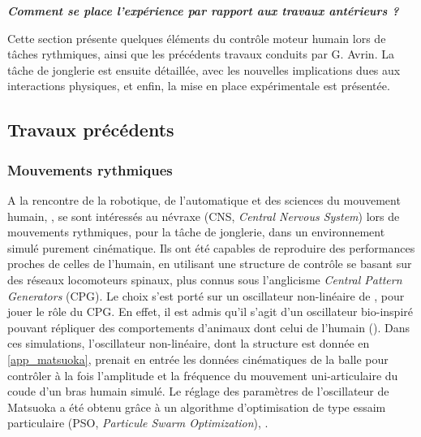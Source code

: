 \documentclass[12pt, a4paper]{article} %
\numberwithin{equation}{section}
\begin{document}
\begin{flushright}
	{\color{DarkGoldenrod} \textit{\textbf{Comment se place l'expérience par rapport aux travaux antérieurs ?}}}
\end{flushright}

Cette section présente quelques éléments du contrôle moteur humain lors de tâches rythmiques, ainsi que les précédents travaux conduits par G. Avrin. La tâche de jonglerie est ensuite détaillée, avec les nouvelles implications dues aux interactions physiques, et enfin, la mise en place expérimentale est présentée.


\subsection{Travaux précédents} \label{sec_bouncing_sub_previous}

\subsubsection{Mouvements rythmiques} \label{sec_bouncing_sub_previous_sub_rhythmic}

A la rencontre de la robotique, de l'automatique et des sciences du mouvement humain, \cite{siegler_passive_2010, avrin_model_2017}, se sont intéressés au névraxe (CNS, \textit{Central Nervous System}) lors de mouvements rythmiques, pour la tâche de jonglerie, dans un environnement simulé purement cinématique. Ils ont été capables de reproduire des performances proches de celles de l'humain, en utilisant une structure de contrôle se basant sur des réseaux locomoteurs spinaux, plus connus sous l'anglicisme \textit{Central Pattern Generators} (CPG). Le choix s'est porté sur un oscillateur non-linéaire de \cite{matsuoka_sustained_1985}, pour jouer le rôle du CPG. En effet, il est admis qu'il s'agit d'un oscillateur bio-inspiré pouvant répliquer des comportements d'animaux dont celui de l'humain (\cite{zhang_analysis_2006,ijspeert_central_2008, pelc_resonant_2008, roy_chowdhury_finding_2015, avrin_model_2017}). Dans ces simulations, l'oscillateur non-linéaire, dont la structure est donnée en \cref{app_matsuoka}, prenait en entrée les données cinématiques de la balle pour contrôler à la fois l'amplitude et la fréquence du mouvement uni-articulaire du coude d'un bras humain simulé. Le réglage des paramètres de l'oscillateur de Matsuoka a été obtenu grâce à un algorithme d'optimisation de type essaim particulaire (PSO, \textit{Particule Swarm Optimization}), \cite{avrin_particle_2016}.
\end{document}
